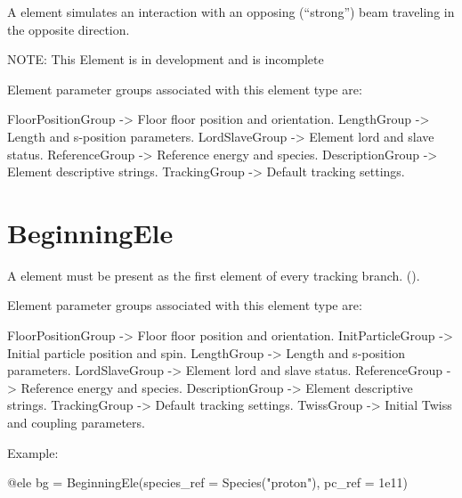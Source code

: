A  element simulates an interaction with an opposing
(``strong'') beam traveling in the opposite direction.

NOTE: This Element is in development and is incomplete

Element parameter groups associated with this element type are:
\TOPrule
\begin{example}
  FloorPositionGroup -> Floor floor position and orientation.  
  LengthGroup        -> Length and s-position parameters.  
  LordSlaveGroup     -> Element lord and slave status.  
  ReferenceGroup     -> Reference energy and species.  
  DescriptionGroup   -> Element descriptive strings.  
  TrackingGroup      -> Default tracking settings.  
\end{example}
\BOTTOMrule


\newpage

\section{BeginningEle}
\label{s:begin.ele}

A  element must be present as the first element of every tracking branch.
().

Element parameter groups associated with this element type are:
\TOPrule
\begin{example}
  FloorPositionGroup -> Floor floor position and orientation.  
  InitParticleGroup  -> Initial particle position and spin.  
  LengthGroup        -> Length and s-position parameters.  
  LordSlaveGroup     -> Element lord and slave status.  
  ReferenceGroup     -> Reference energy and species.  
  DescriptionGroup   -> Element descriptive strings.  
  TrackingGroup      -> Default tracking settings.  
  TwissGroup         -> Initial Twiss and coupling parameters.  
\end{example}
\BOTTOMrule


Example:
\begin{example}
  @ele bg = BeginningEle(species_ref = Species("proton"), pc_ref = 1e11)
\end{example}

